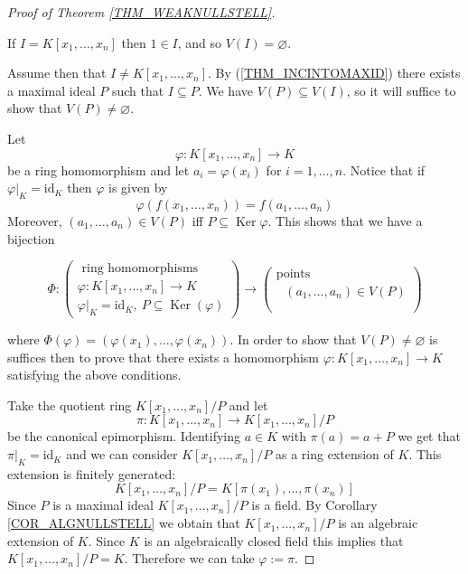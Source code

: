 \documentclass[12pt, letterpaper, oneside]{article}
\theoremstyle{plain}
\theoremstyle{definition}
\newcommand{\lra}{\longrightarrow}
\newcommand{\id}{\mathrm{id}}
\newcommand{\Ker}{\operatorname{Ker}}
\begin{document}
\begin{proof}[Proof of Theorem \ref{THM_WEAKNULLSTELL}] \ 

If $I = K[x_{1}, \dots, x_{n}]$ then $1\in I$, and so $V(I)= \varnothing$. 

Assume then that $I\neq K[x_{1}, \dots, x_{n}]$. By (\ref{THM_INCINTOMAXID})
there exists a maximal ideal $P$ such that $I\subseteq P$. We have $V(P) \subseteq V(I)$, 
so it will suffice to show that $V(P)\neq \varnothing$. 


Let 
$$\varphi \colon K[x_{1}, \dots , x_{n}] \to K$$
be a ring homomorphism and let $a_{i}= \varphi(x_{i})$ for $i=1, \dots, n$.  
Notice that if $\varphi|_{K} = \id_{K}$ then $\varphi$ is given by 
$$\varphi(f(x_{1}, \dots, x_{n})) = f(a_{1}, \dots, a_{n})$$
Moreover, $(a_{1}, \dots, a_{n})\in V(P)$ iff $P\subseteq \Ker\varphi$. 
This shows that we have a bijection 

$$
\Phi\colon
\begin{pmatrix}
\text{ ring homomorphisms} \\[2mm]
\text{$\varphi \colon K[x_{1}, \dots , x_{n}] \to K$} \\[2mm]
\text{$\varphi|_{K} = \id_{K}, \ P\subseteq \Ker(\varphi)$}
\end{pmatrix}
\lra
\begin{pmatrix}
\text{points} \\[2mm]
\text{ $(a_{1}, \dots, a_{n})\in V(P)$} \\[2mm]
\\
\end{pmatrix}
$$

where $\Phi(\varphi) = (\varphi(x_{1}), \dots, \varphi(x_{n}))$. In order to show that 
$V(P)\neq \varnothing$ is suffices then to prove that there exists a homomorphism 
$\varphi\colon K[x_{1}, \dots, x_{n}] \to K$ satisfying the above conditions. 


 
Take the quotient ring  $K[x_{1}, \dots, x_{n}]/P$ and let 
$$\pi \colon K[x_{1}, \dots, x_{n}] \to K[x_{1}, \dots, x_{n}]/P$$
be the canonical epimorphism. Identifying $a\in K$ with $\pi(a) = a+P$
we get that $\pi|_{K} = \id_{K}$ and we can consider $K[x_{1}, \dots, x_{n}]/P$ 
as a ring extension of $K$. 
This extension is finitely generated:
$$K[x_{1}, \dots, x_{n}]/P  = K[\pi(x_{1}), \dots, \pi(x_{n})]$$
Since $P$ is a maximal ideal $K[x_{1}, \dots, x_{n}]/P$ is a field. 
By Corollary \ref{COR_ALGNULLSTELL} we obtain  that $K[x_{1}, \dots, x_{n}]/P$  
is an algebraic extension of $K$. Since $K$ is an algebraically closed field
this implies that $K[x_{1}, \dots, x_{n}]/P=K$. Therefore we can take 
$\varphi := \pi$. 

\end{proof}
\end{document}
